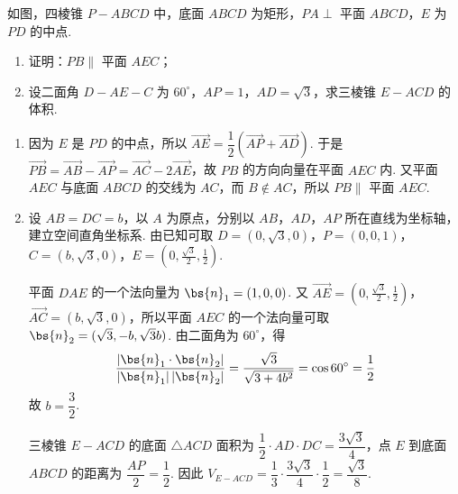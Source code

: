 \begin{problem}
如图，四棱锥 \(P-ABCD\) 中，底面 \(ABCD\) 为矩形，\(PA\perp\) 平面 \(ABCD\)，\(E\) 为 \(PD\) 的中点.
\begin{enumerate}
\item 证明：\(PB\parallel\) 平面 \(AEC\)；
\item 设二面角 \(D-AE-C\) 为 \(60^{\circ}\)，\(AP=1\)，\(AD=\sqrt{3}\)，求三棱锥 \(E-ACD\) 的体积.
\end{enumerate}

\end{problem}

\begin{solution}
\begin{enumerate}
\item 因为 \(E\) 是 \(PD\) 的中点，所以
\(\overrightarrow{AE}=\dfrac{1}{2}\left(\overrightarrow{AP}+\overrightarrow{AD}\right)\). 于是
\(\overrightarrow{PB}=\overrightarrow{AB}-\overrightarrow{AP}=\overrightarrow{AC}-2\overrightarrow{AE}\)，故 \(PB\) 的方向向量在平面 \(AEC\) 内. 又平面 \(AEC\) 与底面 \(ABCD\) 的交线为 \(AC\)，而 \(B\notin AC\)，所以 \(PB\parallel\) 平面 \(AEC\).

\item 设 \(AB=DC=b\)，以 \(A\) 为原点，分别以 \(AB\)，\(AD\)，\(AP\) 所在直线为坐标轴，建立空间直角坐标系. 由已知可取
\(D=(0,\sqrt{3},0)\)，\(P=(0,0,1)\)，\(C=(b,\sqrt{3},0)\)，\(E=(0,\frac{\sqrt{3}}{2},\frac{1}{2})\).

平面 \(DAE\) 的一个法向量为 \(\bs{n}_1=(1,0,0)\). 又
\(\overrightarrow{AE}=(0,\frac{\sqrt{3}}{2},\frac{1}{2})\)，\(\overrightarrow{AC}=(b,\sqrt{3},0)\)，所以平面 \(AEC\) 的一个法向量可取 \(\bs{n}_2=(\sqrt{3},-b,\sqrt{3}b)\). 由二面角为 \(60^{\circ}\)，得
\[
\frac{\left|\bs{n}_1\cdot\bs{n}_2\right|}{\left|\bs{n}_1\right|\left|\bs{n}_2\right|}
=\frac{\sqrt{3}}{\sqrt{3+4b^2}}=\cos60^{\circ}=\frac{1}{2}
\]
故 \(b=\dfrac{3}{2}\).

三棱锥 \(E-ACD\) 的底面 \(\triangle ACD\) 面积为 \(\dfrac{1}{2}\cdot AD\cdot DC=\dfrac{3\sqrt{3}}{4}\)，点 \(E\) 到底面 \(ABCD\) 的距离为 \(\dfrac{AP}{2}=\dfrac{1}{2}\). 因此
\(V_{E-ACD}=\dfrac{1}{3}\cdot\dfrac{3\sqrt{3}}{4}\cdot\dfrac{1}{2}=\dfrac{\sqrt{3}}{8}\).
\end{enumerate}
\end{solution}

